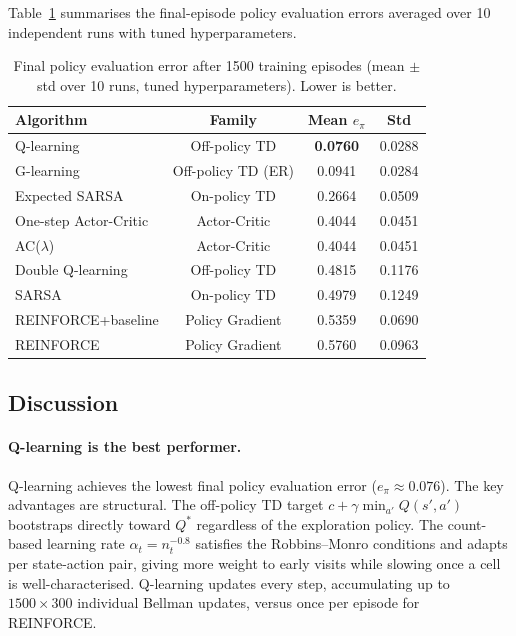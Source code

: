 \documentclass[11pt]{article}
\begin{document}
Table~\ref{tab:final_results} summarises the final-episode policy evaluation
errors averaged over 10 independent runs with tuned hyperparameters.

\begin{table}[H]
\centering
\caption{Final policy evaluation error after 1500 training episodes
(mean $\pm$ std over 10 runs, tuned hyperparameters).  Lower is better.}
\label{tab:final_results}
\begin{tabular}{lccc}
\toprule
Algorithm & Family & Mean $e_\pi$ & Std \\
\midrule
Q-learning            & Off-policy TD      & \textbf{0.0760} & 0.0288 \\
G-learning            & Off-policy TD (ER) & 0.0941          & 0.0284 \\
Expected SARSA        & On-policy TD       & 0.2664          & 0.0509 \\
One-step Actor-Critic & Actor-Critic       & 0.4044          & 0.0451 \\
AC($\lambda$)         & Actor-Critic       & 0.4044          & 0.0451 \\
Double Q-learning     & Off-policy TD      & 0.4815          & 0.1176 \\
SARSA                 & On-policy TD       & 0.4979          & 0.1249 \\
REINFORCE+baseline    & Policy Gradient    & 0.5359          & 0.0690 \\
REINFORCE             & Policy Gradient    & 0.5760          & 0.0963 \\
\bottomrule
\end{tabular}
\end{table}

\subsection{Discussion}

\paragraph{Q-learning is the best performer.}
Q-learning achieves the lowest final policy evaluation error ($e_\pi \approx
0.076$).  The key advantages are structural.  The off-policy TD target
$c + \gamma\min_{a'}Q(s',a')$ bootstraps directly toward $Q^*$ regardless
of the exploration policy.  The count-based learning rate $\alpha_t =
n_t^{-0.8}$ satisfies the Robbins--Monro conditions and adapts per
state-action pair, giving more weight to early visits while slowing once a
cell is well-characterised.  Q-learning updates every step, accumulating
up to $1500 \times 300$ individual Bellman updates, versus once per episode
for REINFORCE.
\end{document}
